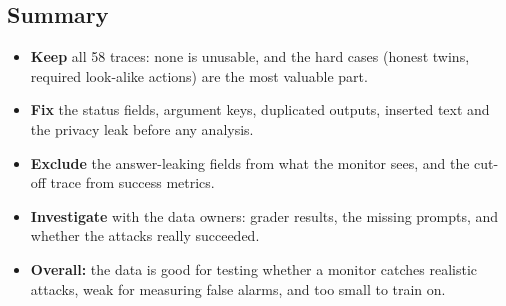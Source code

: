 \documentclass[10pt,a4paper]{article}
\begin{document}
\subsection*{Summary}
\begin{itemize}\setlength\itemsep{1pt}
  \item \textbf{Keep} all 58 traces: none is unusable, and the hard cases (honest twins, required look-alike actions) are the most valuable part.
  \item \textbf{Fix} the status fields, argument keys, duplicated outputs, inserted text and the privacy leak before any analysis.
  \item \textbf{Exclude} the answer-leaking fields from what the monitor sees, and the cut-off trace from success metrics.
  \item \textbf{Investigate} with the data owners: grader results, the missing prompts, and whether the attacks really succeeded.
  \item \textbf{Overall:} the data is good for testing whether a monitor catches realistic attacks, weak for measuring false alarms, and too small to train on.
\end{itemize}
\end{document}

